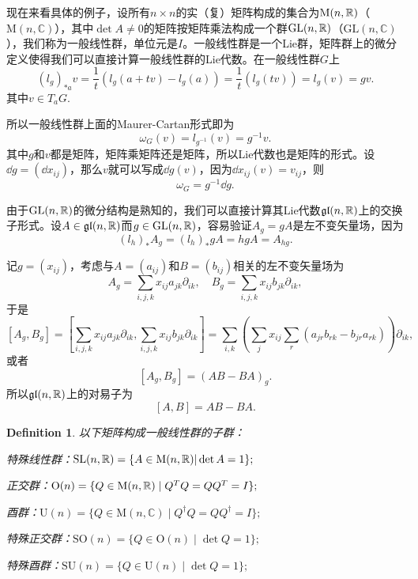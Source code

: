 \documentclass[9pt]{extbook}
\theoremstyle{plain}
\newtheorem{defi}{Definition}
\newcommand{\cc}{\mathbb{C}}
\begin{document}
现在来看具体的例子，设所有$n\times n$的实（复）矩阵构成的集合为$\mathrm{M}(n,\mathbb{R})$（$\mathrm{M}(n,\cc)$），其中$\det A\neq 0$的矩阵按矩阵乘法构成一个群$\mathrm{GL}(n,\mathbb{R})$（$\mathrm{GL}(n,\cc)$），我们称为一般线性群，单位元是$I$。一般线性群是一个Lie群，矩阵群上的微分定义使得我们可以直接计算一般线性群的Lie代数。在一般线性群$G$上
\[
	(l_g)_{*a}v=\frac{1}{t}(l_g(a+tv)-l_g(a))
	=\frac{1}{t}(l_g(tv))=l_g(v)=gv.
\]
其中$v\in T_aG$.

所以一般线性群上面的Maurer-Cartan形式即为
\[
	\omega_G(v)=l_{g^{-1}}(v)=g^{-1}v.
\]
其中$g$和$v$都是矩阵，矩阵乘矩阵还是矩阵，所以Lie代数也是矩阵的形式。设$\dd g=(\dd x_{ij})$，那么$v$就可以写成$\dd g(v)$，因为$\dd x_{ij}(v)=v_{ij}$，则
\[
	\omega_G=g^{-1}\dd g.
\]

由于$\mathrm{GL}(n,\mathbb{R})$的微分结构是熟知的，我们可以直接计算其Lie代数$\mathfrak{gl}(n,\mathbb{R})$上的交换子形式。设$A\in\mathfrak{gl}(n,\mathbb{R})$而$g\in\mathrm{GL}(n,\mathbb{R})$，容易验证$A_g=gA$是左不变矢量场，因为
\[
	(l_h)_{*}A_g=(l_h)_{*}gA=hgA=A_{hg}.
\]

记$g=(x_{ij})$，考虑与$A=(a_{ij})$和$B=(b_{ij})$相关的左不变矢量场为
\[
A_g=\sum_{i,j,k}x_{ij}a_{jk}\partial_{ik},\quad B_g=\sum_{i,j,k}x_{ij}b_{jk}\partial_{ik},
\]
于是
\[
[A_g,B_g]=\left[\sum_{i,j,k}x_{ij}a_{jk}\partial_{ik},\sum_{i,j,k}x_{ij}b_{jk}\partial_{ik}\right]=\sum_{i,k}\left(\sum_{j}x_{ij}\sum_{r}(a_{jr}b_{rk}-b_{jr}a_{rk})\right)\partial_{ik},
\]
或者
\[
[A_g,B_g]=(AB-BA)_g.
\]
所以$\mathfrak{gl}(n,\mathbb{R})$上的对易子为
\[
[A,B]=AB-BA.
\]

\begin{defi}以下矩阵构成一般线性群的子群：

 特殊线性群：$\mathrm{SL}(n,\mathbb{R})=\{A\in \mathrm{M}(n,\mathbb{R})|\det A=1\};$

 正交群：$\mathrm{O}(n) = \{ Q \in \mathrm{M}(n,\mathbb{R}) \mid Q^T Q = Q Q^T = I \};$

 酉群：$\mathrm{U}(n) = \{ Q \in \mathrm{M}(n,\cc) \mid Q^\dag Q = Q Q^\dag = I \};$

 特殊正交群：$\mathrm{SO}(n) =\{ Q \in \mathrm{O}(n) \mid \det Q=1 \};$

 特殊酉群：$\mathrm{SU}(n) =\{ Q \in \mathrm{U}(n) \mid \det Q=1 \};$
\end{defi}
\end{document}

